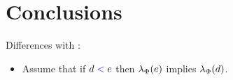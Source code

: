 \section{Conclusions}
\label{sec:outro}

Differences with \cite{2019-sp}:
\begin{itemize}
\item Assume that if $d\mathrel{{\color{blue}<}}e$ then $\lambda_{\Phi}(e)$ implies
    $\lambda_{\Phi}(d)$.
\end{itemize}

